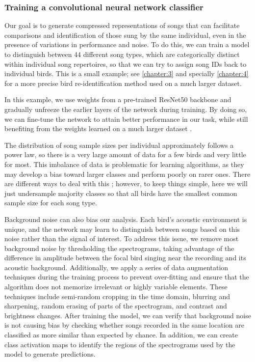 
\subsubsection{Training a convolutional neural network classifier}
Our goal is to generate compressed representations of songs that can facilitate comparisons and identification of those sung by the same individual, even in the presence of variations in performance and noise. To do this, we can train a model to distinguish between 44 different song types, which are categorically distinct within individual song repertoires, so that we can try to assign song IDs back to individual birds. This is a small example; see \autoref{chapter:3} and specially \autoref{chapter:4} for a more precise bird re-identification method used on a much larger dataset.

In this example, we use weights from a pre-trained ResNet50 backbone \parencite{he2015} and gradually unfreeze the earlier layers of the network during training. By doing so, we can fine-tune the network to attain better performance in our task, while still benefiting from the weights learned on a much larger dataset \parencite{zhuang2021}. 

The distribution of song sample sizes per individual approximately follows a
power law, so there is a very large amount of data for a few birds and very
little for most. This imbalance of data is problematic for learning algorithms, as they may develop a bias toward larger classes and perform poorly on rarer ones. There are different ways to deal with this \parencite[see, e.g.,][]{krawczyk2016, thabtah2020}; however, to keep things simple, here we will just undersample majority classes so that all birds have the smallest common sample size for each song type.

Background noise can also bias our analysis. Each bird's acoustic environment is unique, and the network may learn to distinguish between songs based on this noise rather than the signal of interest. To address this issue, we remove most background noise by thresholding the spectrograms, taking advantage of the difference in amplitude between the focal bird singing near the recording and its acoustic background. Additionally, we apply a series of data augmentation techniques during the training process to prevent over-fitting and ensure that the algorithm does not memorize irrelevant or highly variable elements. These techniques include semi-random cropping in the time domain, blurring and sharpening, random erasing of parts of the spectrogram, and contrast and brightness changes. After training the model, we can verify that background noise is not causing bias by checking whether songs recorded in the same location are classified as more similar than expected by chance. In addition, we can create class activation maps to identify the regions of the spectrograms used by the model to generate predictions.

